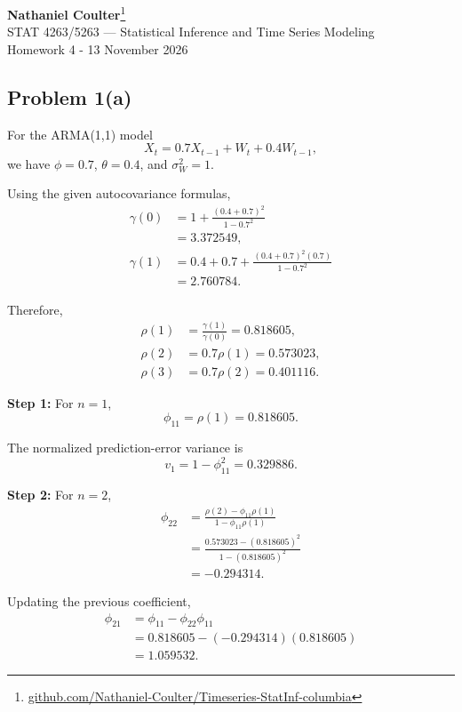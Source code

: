 \documentclass[11pt]{article}
\begin{document}
\vspace*{0.25in}

\begin{center}
    {\Large\textbf{Nathaniel Coulter}\footnote{\href{https://github.com/Nathaniel-Coulter/Timeseries-StatInf-columbia}{github.com/Nathaniel-Coulter/Timeseries-StatInf-columbia}}}\\[3pt]
    {\large STAT 4263/5263 — Statistical Inference and Time Series Modeling}\\
    {\normalsize Homework 4 - 13 November 2026}
\end{center}

\vspace{0.5em}


\subsection*{Problem 1(a)}

For the ARMA(1,1) model
\[
X_t=0.7X_{t-1}+W_t+0.4W_{t-1},
\]
we have \(\phi=0.7\), \(\theta=0.4\), and
\(\sigma_W^2=1\).

Using the given autocovariance formulas,
\[
\begin{aligned}
\gamma(0)
&=1+\frac{(0.4+0.7)^2}{1-0.7^2}\\
&=3.372549,
\\[4pt]
\gamma(1)
&=0.4+0.7+
\frac{(0.4+0.7)^2(0.7)}{1-0.7^2}\\
&=2.760784.
\end{aligned}
\]

Therefore,
\[
\begin{aligned}
\rho(1)&=\frac{\gamma(1)}{\gamma(0)}
=0.818605,\\
\rho(2)&=0.7\rho(1)=0.573023,\\
\rho(3)&=0.7\rho(2)=0.401116.
\end{aligned}
\]

\textbf{Step 1:} For \(n=1\),
\[
\boxed{\phi_{11}=\rho(1)=0.818605}.
\]

The normalized prediction-error variance is
\[
v_1=1-\phi_{11}^2=0.329886.
\]

\textbf{Step 2:} For \(n=2\),
\[
\begin{aligned}
\phi_{22}
&=\frac{\rho(2)-\phi_{11}\rho(1)}
{1-\phi_{11}\rho(1)}\\
&=\frac{0.573023-(0.818605)^2}
{1-(0.818605)^2}\\
&=\boxed{-0.294314}.
\end{aligned}
\]

Updating the previous coefficient,
\[
\begin{aligned}
\phi_{21}
&=\phi_{11}-\phi_{22}\phi_{11}\\
&=0.818605-(-0.294314)(0.818605)\\
&=\boxed{1.059532}.
\end{aligned}
\]
\end{document}
